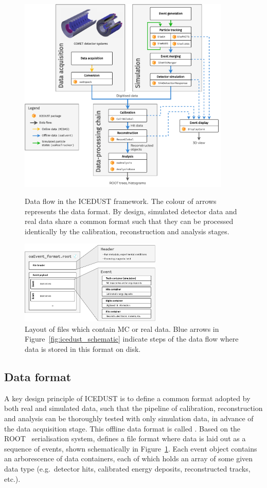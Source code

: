 \begin{figure}
    \centering
    \includegraphics[width=0.9\textwidth]{chapter3/ICEDUST_vertical.drawio.pdf}
    \caption{Data flow in the ICEDUST framework. The colour of arrows represents
        the data format. By design, simulated detector data and real data share
        a common format such that they can be processed identically by the
        calibration, reconstruction and analysis stages.}
    \label{fig:icedust_schematic}
    \vspace{1.2cm}
    \includegraphics[width=0.6\textwidth]{chapter3/oaEvent.drawio.pdf}
    \caption{Layout of \oaEvent files which contain MC or real data. Blue arrows
    in Figure~\ref{fig:icedust_schematic} indicate steps of the data flow where
    data is stored in this format on disk.}
    \label{fig:oaEvent}
\end{figure}

\subsection{Data format}
A key design principle of ICEDUST is to define a common format adopted by both real and simulated data, such that the pipeline of calibration, reconstruction and analysis can be thoroughly tested with only simulation data, in advance of the data acquisition stage. 
This offline data format is called \oaEvent. Based on the ROOT~\cite{BRUN199781} serialisation system, \oaEvent defines a file format where data is laid out as a sequence of events, shown schematically in Figure~\ref{fig:oaEvent}. Each event object contains an arborescence of data containers, each of which holds an array of some given data type (e.g.\ detector hits, calibrated energy deposits, reconstructed tracks, etc.).

